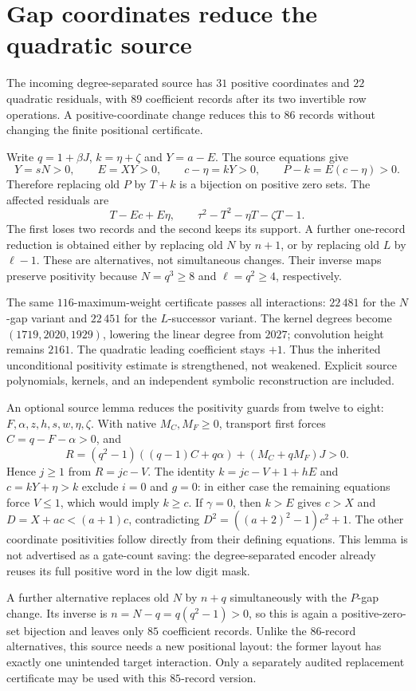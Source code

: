 \section{Gap coordinates reduce the quadratic source}
The incoming degree-separated source has $31$ positive coordinates and
$22$ quadratic residuals, with $89$ coefficient records after its two
invertible row operations. A positive-coordinate change reduces this to
$86$ records without changing the finite positional certificate.

Write $q=1+\beta J$, $k=\eta+\zeta$ and $Y=a-E$.
The source equations give
\[
 Y=sN>0,\qquad E=XY>0,\qquad c-\eta=kY>0,
 \qquad P-k=E(c-\eta)>0.
\]
Therefore replacing old $P$ by $T+k$ is a bijection on positive zero sets.
The affected residuals are
\[
 T-Ec+E\eta,\qquad \tau^2-T^2-\eta T-\zeta T-1.
\]
The first loses two records and the second keeps its support. A further
one-record reduction is obtained either by replacing old $N$ by $n+1$,
or by replacing old $L$ by $\ell-1$. These are alternatives, not simultaneous
changes. Their inverse maps preserve positivity because $N=q^3\ge8$ and
$\ell=q^2\ge4$, respectively.

The same $116$-maximum-weight certificate passes all interactions:
$22\,481$ for the $N$-gap variant and $22\,451$ for the $L$-successor variant.
The kernel degrees become $(1719,2020,1929)$, lowering the linear degree
from $2027$; convolution height remains $2161$. The quadratic leading
coefficient stays $+1$. Thus the inherited unconditional positivity estimate
is strengthened, not weakened. Explicit source polynomials, kernels, and an
independent symbolic reconstruction are included.

An optional source lemma reduces the positivity guards from twelve to eight:
$F,\alpha,z,h,s,w,\eta,\zeta$. With native $M_C,M_F\ge0$, transport first
forces $C=q-F-\alpha>0$, and
\[
 R=(q^2-1)((q-1)C+q\alpha)+(M_C+qM_F)J>0.
\]
Hence $j\ge1$ from $R=jc-V$. The identity
$k=jc-V+1+hE$ and $c=kY+\eta>k$ exclude $i=0$ and $g=0$:
in either case the remaining equations force $V\le1$, which would imply
$k\ge c$. If $\gamma=0$, then $k>E$ gives $c>X$ and
$D=X+ac<(a+1)c$, contradicting
$D^2=((a+2)^2-1)c^2+1$. The other coordinate positivities follow directly
from their defining equations. This lemma is not advertised as a gate-count
saving: the degree-separated encoder already reuses its full positive word
in the low digit mask.

A further alternative replaces old $N$ by $n+q$ simultaneously with the
$P$-gap change. Its inverse is $n=N-q=q(q^2-1)>0$, so this is again a
positive-zero-set bijection and leaves only $85$ coefficient records.
Unlike the $86$-record alternatives, this source needs a new positional
layout: the former layout has exactly one unintended target interaction.
Only a separately audited replacement certificate may be used with this
$85$-record version.
